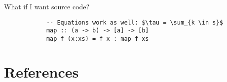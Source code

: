 \documentclass[mathserif]{beamer}
\begin{document}
\begin{frame}[fragile]{What if I want source code?}
    \begin{listing}[H]
        \begin{verbatim}
            -- Equations work as well: $\tau = \sum_{k \in s}$
            map :: (a -> b) -> [a] -> [b]
            map f (x:xs) = f x : map f xs
        \end{verbatim}
        \caption{Some Haskell source code}
        \label{lst:haskell}
    \end{listing}
\end{frame}

\section{References}


\end{document}
